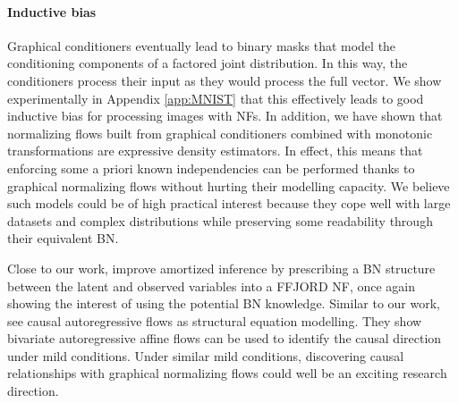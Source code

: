 \paragraph{Inductive bias}
Graphical conditioners eventually lead to binary masks that model the conditioning components of a factored joint distribution. In this way, the conditioners process their input as they would process the full vector.%
We show experimentally in Appendix \ref{app:MNIST} that this effectively leads to good inductive bias for processing images with NFs.
In addition, we have shown that normalizing flows built from graphical conditioners combined with monotonic transformations are expressive density estimators.
In effect, this means that enforcing some a priori known independencies can be performed thanks to graphical normalizing flows without hurting their modelling capacity. We believe such models could be of high practical interest because they cope well with large datasets and complex distributions while preserving some readability through their equivalent BN.

Close to our work, \citet{wood} improve amortized inference by prescribing a BN structure between the latent and observed variables into a FFJORD NF, once again showing the interest of using the potential BN knowledge. Similar to our work, \citet{khemakhem2020causal} see causal autoregressive flows as structural equation modelling. They show bivariate autoregressive affine flows can be used to identify the causal direction under mild conditions. Under similar mild conditions, discovering causal relationships with graphical normalizing flows could well be an exciting research direction.



